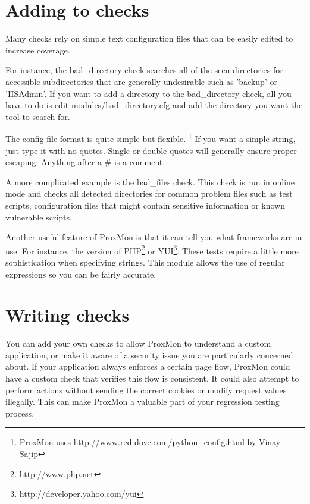 \documentclass{article}
\begin{document}
\section{Adding to checks}
Many checks rely on simple text configuration files that can be easily edited to 
increase coverage.

For instance, the bad\_directory check searches all of the seen directories for accessible
subdirectories that are generally undesirable such as 'backup' or 'IISAdmin'.
If you want to add a directory to the bad\_directory check, all you have to do
is edit modules/bad\_directory.cfg and add the directory you want the tool to search for.


The config file format is quite simple but flexible. 
\footnote{ProxMon uses http://www.red-dove.com/python\_config.html by Vinay Sajip}
If you want a simple string, just type it with no quotes.  Single or double
quotes will generally ensure proper escaping.  Anything after a \# is a comment.

A more complicated example is the bad\_files check.  This check is run in online mode 
and checks all detected directories for common problem files such as test scripts, 
configuration files that might contain sensitive information or known vulnerable scripts.


Another useful feature of ProxMon is that it can tell you what frameworks are in 
use.  For instance, the version of PHP\footnote{http://www.php.net} or 
YUI\footnote{http://developer.yahoo.com/yui}.  These tests require a little more
sophistication when specifying strings.  This module allows the use of regular
expressions so you can be fairly accurate.  


\section{Writing checks}
You can add your own checks to allow ProxMon to understand a custom application, or 
make it aware of a security issue you are particularly concerned about. If your 
application always enforces a certain page flow, ProxMon could have a custom check 
that verifies this flow is consistent. It could also attempt to perform actions 
without sending the correct cookies or modify request values illegally. This can make 
ProxMon a valuable part of your regression testing process.  
\end{document}

